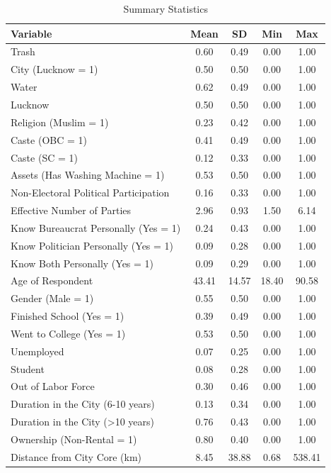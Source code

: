 \begin{table}[H]
\centering
\caption{Summary Statistics}
\scriptsize  %
\begin{tabular}{|p{4.5cm}|c|c|c|c|}
\hline
\textbf{Variable} & \textbf{Mean} & \textbf{SD} & \textbf{Min} & \textbf{Max} \\ \hline
Trash & 0.60 & 0.49 & 0.00 & 1.00 \\ \hline
City (Lucknow = 1) & 0.50 & 0.50 & 0.00 & 1.00 \\ \hline
Water & 0.62 & 0.49 & 0.00 & 1.00 \\ \hline
Lucknow & 0.50 & 0.50 & 0.00 & 1.00 \\ \hline
Religion (Muslim = 1) & 0.23 & 0.42 & 0.00 & 1.00 \\ \hline
Caste (OBC = 1) & 0.41 & 0.49 & 0.00 & 1.00 \\ \hline
Caste (SC = 1) & 0.12 & 0.33 & 0.00 & 1.00 \\ \hline
Assets (Has Washing Machine = 1) & 0.53 & 0.50 & 0.00 & 1.00 \\ \hline
Non-Electoral Political Participation & 0.16 & 0.33 & 0.00 & 1.00 \\ \hline
Effective Number of Parties & 2.96 & 0.93 & 1.50 & 6.14 \\ \hline
Know Bureaucrat Personally (Yes = 1) & 0.24 & 0.43 & 0.00 & 1.00 \\ \hline
Know Politician Personally (Yes = 1) & 0.09 & 0.28 & 0.00 & 1.00 \\ \hline
Know Both Personally (Yes = 1) & 0.09 & 0.29 & 0.00 & 1.00 \\ \hline
Age of Respondent & 43.41 & 14.57 & 18.40 & 90.58 \\ \hline
Gender (Male = 1) & 0.55 & 0.50 & 0.00 & 1.00 \\ \hline
Finished School (Yes = 1) & 0.39 & 0.49 & 0.00 & 1.00 \\ \hline
Went to College (Yes = 1) & 0.53 & 0.50 & 0.00 & 1.00 \\ \hline
Unemployed & 0.07 & 0.25 & 0.00 & 1.00 \\ \hline
Student & 0.08 & 0.28 & 0.00 & 1.00 \\ \hline
Out of Labor Force & 0.30 & 0.46 & 0.00 & 1.00 \\ \hline
Duration in the City (6-10 years) & 0.13 & 0.34 & 0.00 & 1.00 \\ \hline
Duration in the City (>10 years) & 0.76 & 0.43 & 0.00 & 1.00 \\ \hline
Ownership (Non-Rental = 1) & 0.80 & 0.40 & 0.00 & 1.00 \\ \hline
Distance from City Core (km) & 8.45 & 38.88 & 0.68 & 538.41 \\ \hline
\end{tabular}
\end{table}

